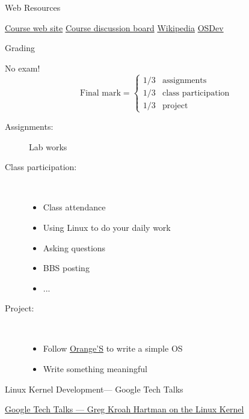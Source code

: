 \begin{frame}{Web Resources}
  \begin{thebibliography}{}
  \bibitem{} \href{http://cs3.swfu.edu.cn/moodle/course/view.php?id=2737}{Course web site}
  \bibitem{} \href{http://cs3.swfu.edu.cn/phpbb/viewforum.php?f=10}{Course discussion board}
  \bibitem{} \href{http://wikipedia.org}{Wikipedia}
  \bibitem{} \href{http://wiki.osdev.org/}{OSDev}
  \end{thebibliography}
\end{frame}

\begin{frame}{Grading}
  \begin{exampleblock}{No exam!}
    \begin{equation*}
      \text{Final mark} =
      \begin{cases}
        1/3& \text{assignments}\\
        1/3& \text{class participation}\\
        1/3& \text{project}
      \end{cases}
    \end{equation*}
  \end{exampleblock}
    \begin{description}
  \item[Assignments:] Lab works
  \item[Class participation:]\ 
    \begin{itemize}
    \item Class attendance
    \item Using Linux to do your daily work
    \item Asking questions
    \item BBS posting
    \item ...
    \end{itemize}
  \item[Project:] \ 
    \begin{itemize}
    \item Follow \href{http://cs2.swfu.edu.cn/pub/resources/Books/OS/OrangeS/}{Orange'S} to write a simple OS
    \item Write something meaningful
    \end{itemize}
  \end{description}
\end{frame}

\begin{frame}{Linux Kernel Development}{--- Google Tech Talks}
  \begin{thebibliography}{}
  \bibitem[]{} \href{http://www.youtube.com/watch?v=L2SED6sewRw}{Google Tech Talks ---
      Greg Kroah Hartman on the Linux Kernel}
  \end{thebibliography}
\end{frame}

